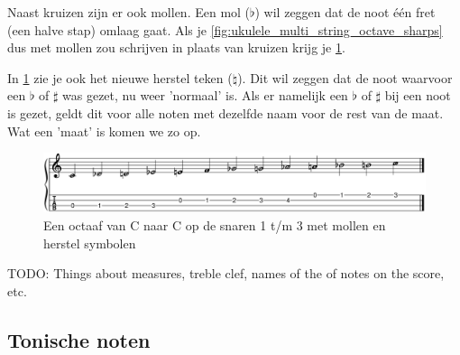 Naast kruizen zijn er ook mollen. Een mol ($\flat$) wil zeggen dat de noot één fret (een halve stap) omlaag gaat. Als je \ref{fig:ukulele_multi_string_octave_sharps} dus met mollen zou schrijven in plaats van kruizen krijg je \ref{fig:ukulele_fretboard_filled_flats}.

In \ref{fig:ukulele_fretboard_filled_flats} zie je ook het nieuwe herstel teken ($\natural$). Dit wil zeggen dat de noot waarvoor een $\flat$ of $\sharp$ was gezet, nu weer 'normaal' is. Als er namelijk een $\flat$ of $\sharp$ bij een noot is gezet, geldt dit voor alle noten met dezelfde naam voor de rest van de maat. Wat een 'maat' is komen we zo op.

\begin{figure}[h]
    \centering
    \includegraphics[width=\textwidth]{image/UkuleleChromaticNotesFlatsMultiString.png}
    \caption{Een octaaf van C naar C op de snaren 1 t/m 3 met mollen en herstel symbolen}
    \label{fig:ukulele_fretboard_filled_flats}
\end{figure}

TODO: Things about measures, treble clef, names of the of notes on the score, etc.

\newpage

\subsection{Tonische noten}

